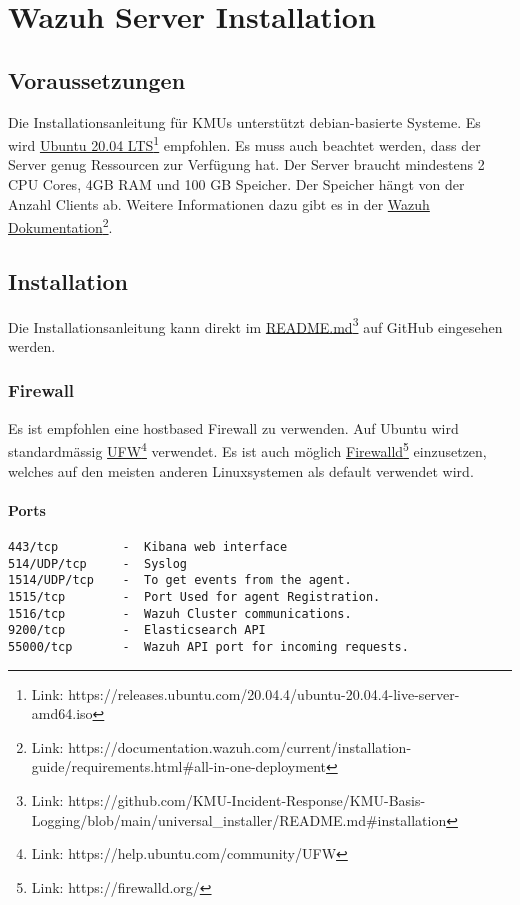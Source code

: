 \chapter{Wazuh Server Installation}

\section{Voraussetzungen}
Die Installationsanleitung für KMUs unterstützt debian-basierte Systeme.
Es wird \href{https://releases.ubuntu.com/20.04.4/ubuntu-20.04.4-live-server-amd64.iso}{Ubuntu 20.04 LTS}\footnote{Link: https://releases.ubuntu.com/20.04.4/ubuntu-20.04.4-live-server-amd64.iso} empfohlen.
Es muss auch beachtet werden, dass der Server genug Ressourcen zur Verfügung hat.
Der Server braucht mindestens 2 CPU Cores, 4GB RAM und 100 GB Speicher.
Der Speicher hängt von der Anzahl Clients ab.
Weitere Informationen dazu gibt es in der \href{https://documentation.wazuh.com/current/installation-guide/requirements.html\#all-in-one-deployment}{Wazuh Dokumentation}\footnote{Link: https://documentation.wazuh.com/current/installation-guide/requirements.html\#all-in-one-deployment}.

\section{Installation}
Die Installationsanleitung kann direkt im \href{https://github.com/KMU-Incident-Response/KMU-Basis-Logging/blob/main/universal\_installer/README.md\#installation}{README.md}\footnote{Link: https://github.com/KMU-Incident-Response/KMU-Basis-Logging/blob/main/universal\_installer/README.md\#installation} auf GitHub eingesehen werden.


\subsection{Firewall}
Es ist empfohlen eine hostbased Firewall zu verwenden.
Auf Ubuntu wird standardmässig \href{https://help.ubuntu.com/community/UFW}{UFW}\footnote{Link: https://help.ubuntu.com/community/UFW} verwendet.
Es ist auch möglich \href{https://firewalld.org/}{Firewalld}\footnote{Link: https://firewalld.org/} einzusetzen, welches auf den meisten anderen Linuxsystemen als default verwendet wird.

\subsubsection{Ports}
\begin{lstlisting}
443/tcp         -  Kibana web interface
514/UDP/tcp     -  Syslog
1514/UDP/tcp    -  To get events from the agent.
1515/tcp        -  Port Used for agent Registration.
1516/tcp        -  Wazuh Cluster communications.
9200/tcp        -  Elasticsearch API
55000/tcp       -  Wazuh API port for incoming requests.
\end{lstlisting}




